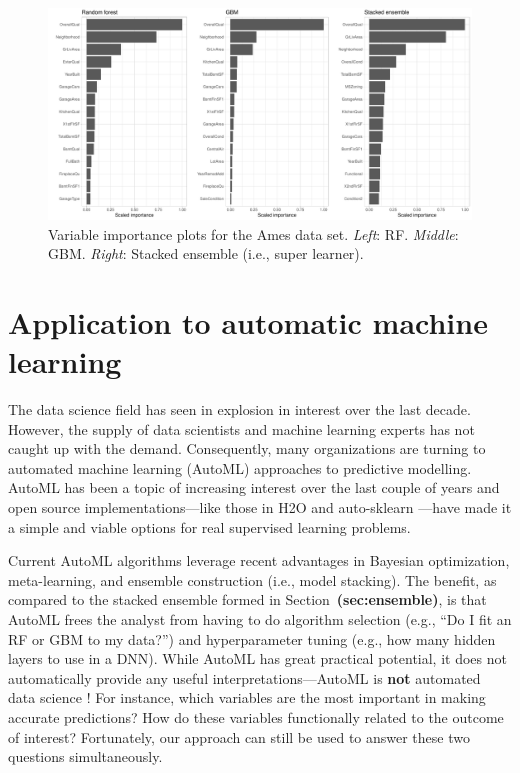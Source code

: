 \documentclass[12pt]{article}
\def\ref#1{\textbf{(#1)}}
\begin{document}
\begin{figure}[!htb]
  \centering
  \includegraphics[width=1.0\textwidth]{ames-ensemble-vip}
  \caption{Variable importance plots for the Ames data set. \textit{Left}: RF. \textit{Middle}: GBM. \textit{Right}: Stacked ensemble (i.e., super learner). \label{fig:ames-ensemble-vip}}
\end{figure}


\section{Application to automatic machine learning}
\label{sec:automl}

The data science field has seen in explosion in interest over the last decade. However, the supply of data scientists and machine learning experts has not caught up with the demand. Consequently, many organizations are turning to automated machine learning (AutoML) approaches to predictive modelling. AutoML has been a topic of increasing interest over the last couple of years and open source implementations---like those in H2O and auto-sklearn \citep{auto-sklearn}---have made it a simple and viable options for real supervised learning problems.

Current AutoML algorithms leverage recent advantages in Bayesian optimization, meta-learning, and ensemble construction (i.e., model stacking). The benefit, as compared to the stacked ensemble formed in Section~\ref{sec:ensemble}, is that AutoML frees the analyst from having to do algorithm selection (e.g., ``Do I fit an RF or GBM to my data?'') and hyperparameter tuning (e.g., how many hidden layers to use in a DNN). While AutoML has great practical potential, it does not automatically provide any useful interpretations---AutoML is \textbf{not} automated data science \citep{mayo_2017}! For instance, which variables are the most important in making accurate predictions? How do these variables functionally related to the outcome of interest? Fortunately, our approach can still be used to answer these two questions simultaneously.
\end{document}

